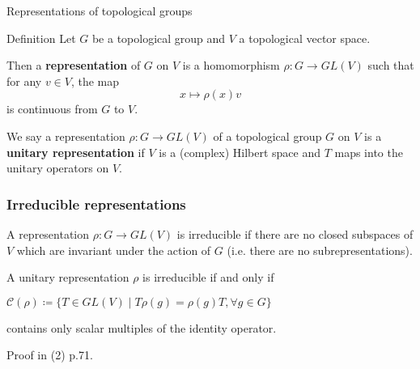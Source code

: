 \documentclass[mathserif
]{beamer}
\begin{document}
\begin{frame}{Representations of topological groups}
    \begin{block}{Definition}
        Let $G$ be a topological group and $V$ a topological vector space.
        
        Then a \textbf{representation} of $G$ on $V$ is a %
        homomorphism $\rho\colon G\to GL(V)$ such that for any $v\in V$, the map \[x\mapsto \rho(x)v\] is continuous from $G$ to $V$. %
    \end{block} 
    \pause

    We say a representation $\rho\colon G\to GL(V)$ of a topological group $G$ on $V$ is a \textbf{unitary representation} if $V$ is a (complex) Hilbert space and $T$ maps into the unitary operators on $V$. %
\end{frame}

\begin{frame}
    \frametitle{Irreducible representations}
    A representation $\rho\colon G\to GL(V)$ is irreducible if there are no closed subspaces of $V$ which are invariant under the action of $G$ (i.e. there are no subrepresentations).
    \pause

    \begin{Theorem}
        A unitary representation $\rho$ is irreducible if and only if \begin{center}
            $\mathcal{C}(\rho)\coloneqq \{T\in GL(V)\mid T\rho(g) = \rho(g) T,\forall g\in G\}$
        \end{center} %
        contains only scalar multiples of the identity operator.
    \end{Theorem} Proof in (2) p.71.
\end{frame}
\end{document}

